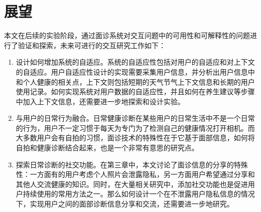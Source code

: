 \section{展望}
本文在后续的实验阶段，通过面诊系统对交互问题中的可用性和可解释性的问题进行了验证和探索，未来可进行的交互研究工作如下：
\begin{enumerate}
	\item 设计如何增加系统的自适应。系统的自适应性包括对用户的自适应和对上下文的自适应。用户自适应性设计的实现需要采集用户信息，并分析出用户信息中和个人健康的相关点，上下文则包括短期的天气节气上下文信息和长期的用户使用记录。如何实现系统对用户数据的自适应性，并且如何在养生建议等步骤中加入上下文信息，还需要进一步地探索和设计实验。

	\item 与用户的日常行为融合。日常健康诊断在某些用户的日常生活中不是一个日常的行为，用户不一定习惯于每天为专门为了检测自己的健康情况打开相机。而大多数用户会有自拍的习惯，面诊技术的特殊性在于它基于面部信息，如何将自拍和健康诊断结合起来，也是一个非常有意思的研究点。

	\item 探索日常诊断的社交功能。在第三章中，本文讨论了面诊信息的分享的特殊性：一方面有的用户考虑个人照片会泄露隐私，另一方面用户希望通过分享和其他人交流健康的知识。同时，在大量相关研究中，添加社交功能也是促进用户持续使用的常用方法之一。那么如何设计一个在不泄露用户隐私信息的情况下，实现用户之间的面部诊断信息分享和交流，还需要进一步地研究。
	
\end{enumerate}